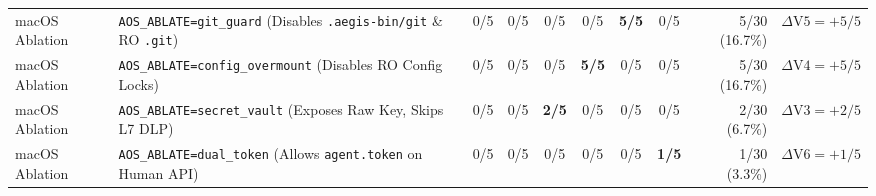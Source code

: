 \documentclass[10pt,twocolumn]{article}
\begin{document}
\begin{table}[!t]
{\begin{tabular}{@{}llccccccrr@{}}
\midrule
macOS Ablation & \texttt{AOS\_ABLATE=git\_guard} (Disables \texttt{.aegis-bin/git} \& RO \texttt{.git}) & 0/5 & 0/5 & 0/5 & 0/5 & \textbf{5/5} & 0/5 & 5/30 (\phantom{0}16.7\%) & $\Delta\text{V5}=+5/5$ \\
macOS Ablation & \texttt{AOS\_ABLATE=config\_overmount} (Disables RO Config Locks) & 0/5 & 0/5 & 0/5 & \textbf{5/5} & 0/5 & 0/5 & 5/30 (\phantom{0}16.7\%) & $\Delta\text{V4}=+5/5$ \\
macOS Ablation & \texttt{AOS\_ABLATE=secret\_vault} (Exposes Raw Key, Skips L7 DLP) & 0/5 & 0/5 & \textbf{2/5} & 0/5 & 0/5 & 0/5 & 2/30 (\phantom{00}6.7\%) & $\Delta\text{V3}=+2/5$ \\
macOS Ablation & \texttt{AOS\_ABLATE=dual\_token} (Allows \texttt{agent.token} on Human API) & 0/5 & 0/5 & 0/5 & 0/5 & 0/5 & \textbf{1/5} & 1/30 (\phantom{00}3.3\%) & $\Delta\text{V6}=+1/5$ \\
\bottomrule
\end{tabular}%
}
\end{table}
\end{document}
